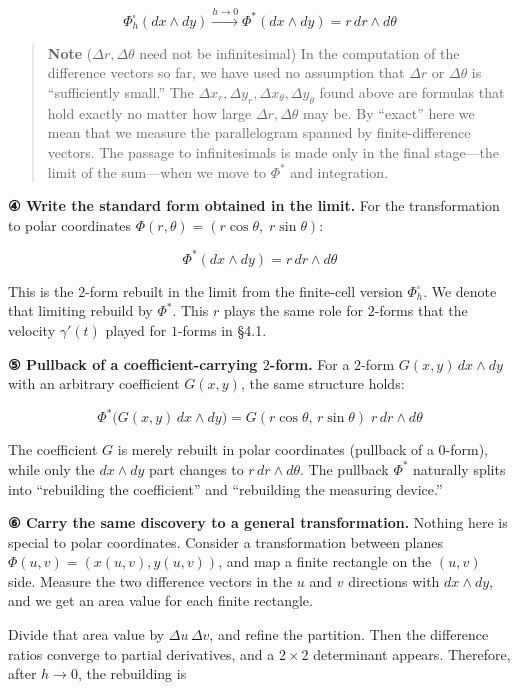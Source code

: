 \documentclass[a4paper,12pt,openany]{book}
\begin{document}
\[
\Phi_h^\square(dx\wedge dy)
\xrightarrow{h\to0}
\Phi^*(dx\wedge dy)
=
r\,dr\wedge d\theta
\]

\begin{quote}
\textbf{Note} (\(\Delta r,\Delta\theta\) need not be infinitesimal) In
the computation of the difference vectors so far, we have used no
assumption that \(\Delta r\) or \(\Delta\theta\) is ``sufficiently
small.'' The
\(\Delta x_r, \Delta y_r, \Delta x_\theta, \Delta y_\theta\) found above
are formulas that hold exactly no matter how large
\(\Delta r,\Delta\theta\) may be. By ``exact'' here we mean that we
measure the parallelogram spanned by finite-difference vectors. The
passage to infinitesimals is made only in the final stage—the limit of
the sum—when we move to \(\Phi^*\) and integration.
\end{quote}

\textbf{④ Write the standard form obtained in the limit.} For the
transformation to polar coordinates
\(\Phi(r,\theta) = (r\cos\theta,\; r\sin\theta)\):

\[\Phi^*(dx \wedge dy) = r\,dr \wedge d\theta\]

This is the \(2\)-form rebuilt in the limit from the finite-cell version
\(\Phi_h^\square\). We denote that limiting rebuild by \(\Phi^*\). This
\(r\) plays the same role for \(2\)-forms that the velocity
\(\gamma'(t)\) played for \(1\)-forms in §4.1.

\textbf{⑤ Pullback of a coefficient-carrying $2$-form.} For a \(2\)-form
\(G(x,y)\,dx \wedge dy\) with an arbitrary coefficient \(G(x,y)\), the
same structure holds:

\[\Phi^*\bigl(G(x,y)\,dx \wedge dy\bigr) = G(r\cos\theta,\, r\sin\theta)\; r\,dr \wedge d\theta\]

The coefficient \(G\) is merely rebuilt in polar coordinates (pullback
of a \(0\)-form), while only the \(dx \wedge dy\) part changes to
\(r\,dr \wedge d\theta\). The pullback \(\Phi^*\) naturally splits into
``rebuilding the coefficient'' and ``rebuilding the measuring device.''

\textbf{⑥ Carry the same discovery to a general transformation.} Nothing
here is special to polar coordinates. Consider a transformation between
planes \(\Phi(u,v)=(x(u,v),y(u,v))\), and map a finite rectangle on the
\((u,v)\) side. Measure the two difference vectors in the \(u\) and
\(v\) directions with \(dx\wedge dy\), and we get an area value for each
finite rectangle.

Divide that area value by \(\Delta u\,\Delta v\), and refine the
partition. Then the difference ratios converge to partial derivatives,
and a \(2\times2\) determinant appears. Therefore, after \(h\to0\), the
rebuilding is
\end{document}
